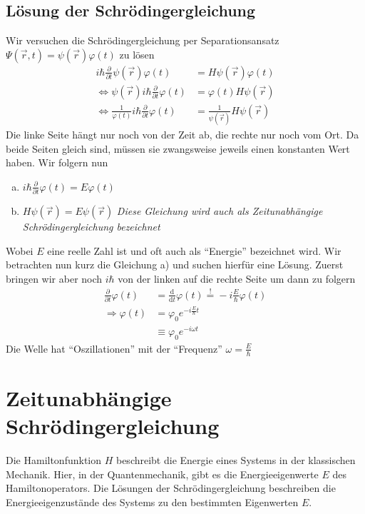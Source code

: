 \documentclass[oneside]{book}
\theoremstyle{definition}
\renewcommand{\d}{\mathrm d}
\newcommand{\dd}[1]{\frac{\d}{\d #1}}
\newcommand{\fpartial}[1]{\frac{\partial}{\partial #1}}
\newcommand{\vp}{\varphi}
\begin{document}
\subsection{Lösung der Schrödingergleichung}
Wir versuchen die Schrödingergleichung per Separationsansatz $\Psi(\vec{r}, t) = \psi(\vec{r}) \vp(t)$ zu lösen
\begin{align*}
	i \hbar \fpartial{t} \psi(\vec{r}) \vp(t) &= H \psi(\vec{r}) \vp(t)\\
	\Leftrightarrow \psi(\vec{r}) i \hbar \fpartial{t} \vp(t) &= \vp(t) H \psi(\vec{r})\\
	\Leftrightarrow \frac{1}{\vp(t)} i \hbar \fpartial{t} \vp(t) &= \frac{1}{\psi(\vec{r})} H \psi(\vec{r})
\end{align*}
Die linke Seite hängt nur noch von der Zeit ab, die rechte nur noch vom Ort. Da beide Seiten gleich sind, müssen sie zwangsweise jeweils einen konstanten Wert haben. Wir folgern nun 
\begin{enumerate}[a)]
	 \item $i \hbar \fpartial{t} \vp(t) = E \vp(t)$
	 \item $H \psi(\vec{r}) = E \psi(\vec{r})$ \textit{Diese Gleichung wird auch als Zeitunabhängige Schrödingergleichung bezeichnet}
\end{enumerate}
Wobei $E$ eine reelle Zahl ist und oft auch als "`Energie"' bezeichnet wird. Wir betrachten nun kurz die Gleichung a) und suchen hierfür eine Lösung.
Zuerst bringen wir aber noch $i \hbar$ von der linken auf die rechte Seite um dann zu folgern
\begin{align*}
	\fpartial{t} \vp(t) &= \dd{t} \vp(t) \overset!= - i \frac{E}{\hbar} \vp(t)\\
	\Rightarrow \vp(t) &= \vp_0 e^{-i\frac{E}{\hbar} t}\\
	&\equiv \vp_0 e^{-i \omega t}
\end{align*}
Die Welle hat "`Oszillationen"' mit der "`Frequenz"' $\omega = \frac{E}{\hbar}$

\section{Zeitunabhängige Schrödingergleichung}
Die Hamiltonfunktion $H$ beschreibt die Energie eines Systems in der klassischen Mechanik. Hier, in der Quantenmechanik, gibt es die Energieeigenwerte $E$ des Hamiltonoperators. Die Lösungen der Schrödingergleichung beschreiben die Energieeigenzustände des Systems zu den bestimmten Eigenwerten $E$.
\end{document}

